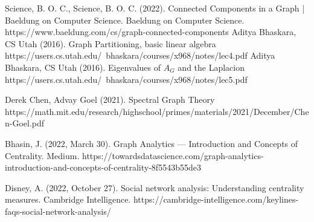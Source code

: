 \documentclass[12pt, a4paper]{article}
\begin{document}
    \begin{thebibliography}{9}
    Science, B. O. C., Science, B. O. C. (2022). Connected Components in a Graph | Baeldung on Computer Science. Baeldung on Computer Science. https://www.baeldung.com/cs/graph-connected-components
    Aditya Bhaskara, CS Utah (2016). Graph Partitioning, basic linear algebra https://users.cs.utah.edu/~bhaskara/courses/x968/notes/lec4.pdf
    Aditya Bhaskara, CS Utah (2016). Eigenvalues of $A_G$ and the Laplacion https://users.cs.utah.edu/~bhaskara/courses/x968/notes/lec5.pdf

    Derek Chen, Advay Goel (2021). Spectral Graph Theory https://math.mit.edu/research/highschool/primes/materials/2021/December/Chen-Goel.pdf

    Bhasin, J. (2022, March 30). Graph Analytics — Introduction and Concepts of Centrality. Medium. https://towardsdatascience.com/graph-analytics-introduction-and-concepts-of-centrality-8f5543b55de3

    Disney, A. (2022, October 27). Social network analysis: Understanding centrality measures. Cambridge Intelligence. https://cambridge-intelligence.com/keylines-faqs-social-network-analysis/

    \end{thebibliography}
\end{document}
